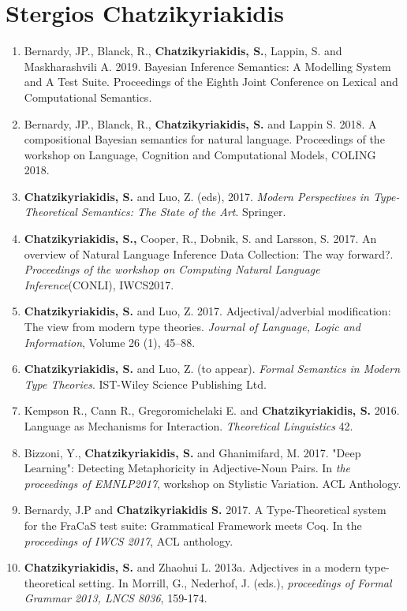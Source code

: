 \documentclass{article}
\begin{document}
\section*{Stergios Chatzikyriakidis}


\begin{enumerate}

\item Bernardy, JP., Blanck, R., \textbf{Chatzikyriakidis, S.}, Lappin, S. and Maskharashvili A. 2019. Bayesian Inference Semantics: A Modelling System and A Test Suite. Proceedings of the Eighth Joint Conference on Lexical and Computational Semantics. 

\item Bernardy, JP., Blanck, R.,  \textbf{Chatzikyriakidis, S.} and Lappin S. 2018. A compositional Bayesian semantics for natural language. Proceedings of the workshop on Language, Cognition and Computational Models, COLING 2018.


\item \textbf{Chatzikyriakidis, S.} and Luo, Z. (eds), 2017. \textit{Modern Perspectives in Type-Theoretical Semantics: The State of the Art}. Springer.


\item \textbf{Chatzikyriakidis, S.,}  Cooper, R.,  Dobnik, S. and  Larsson, S. 2017. An overview of Natural Language Inference Data Collection: The way forward?. \textit{Proceedings of the workshop on Computing Natural Language Inference}(CONLI), IWCS2017.

\item \textbf{Chatzikyriakidis, S.} and Luo, Z. 2017. Adjectival/adverbial modification: The view from modern type theories. \textit{Journal of Language, Logic and Information}, Volume 26 (1), 45–88.


\item \textbf{Chatzikyriakidis, S.} and  Luo, Z. (to appear). \textit{Formal Semantics in Modern Type Theories}. IST-Wiley Science Publishing Ltd. 



\item Kempson R., Cann R., Gregoromichelaki E. and \textbf{Chatzikyriakidis, S.} 2016. Language as Mechanisms for Interaction. \textit{Theoretical Linguistics} 42.


\item Bizzoni, Y., \textbf{Chatzikyriakidis, S.} and Ghanimifard, M. 2017. "Deep Learning": Detecting Metaphoricity in Adjective-Noun Pairs. In \textit{the proceedings of EMNLP2017}, workshop on Stylistic Variation. ACL Anthology.

\item Bernardy, J.P and \textbf{Chatzikyriakidis S.} 2017. A Type-Theoretical system for the FraCaS test suite: Grammatical Framework meets Coq. In the \textit{proceedings of IWCS 2017},  ACL anthology.


\item \textbf{Chatzikyriakidis, S.} and Zhaohui L. 2013a. Adjectives in a modern type-theoretical setting. In Morrill,
G., Nederhof, J. (eds.), \textit{proceedings of Formal Grammar 2013, LNCS 8036}, 159-174.




\end{enumerate}
\end{document}
